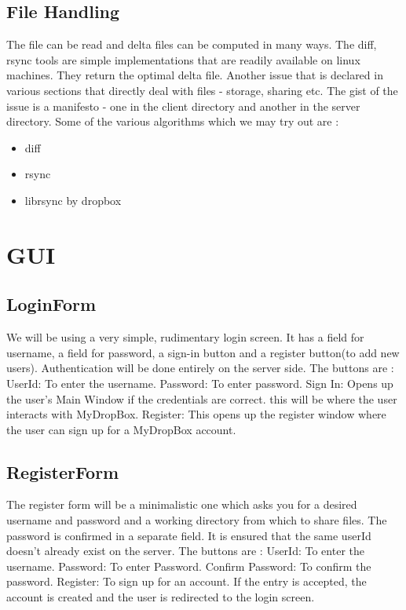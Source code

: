 \documentclass[]{article}
\begin{document}
\subsection{File Handling}
The file can be read and delta files can be computed in many ways. The diff, rsync tools are simple implementations that are readily available on linux machines. They return the optimal delta file.
Another issue that is declared in various sections that directly deal with files - storage, sharing etc.
The gist of the issue is a manifesto - one in the client directory and another in the server directory.
Some of the various algorithms which we may try out are :
\begin{itemize}
\item diff
\item rsync
\item librsync by dropbox
\end{itemize}

\section{GUI}
\subsection{LoginForm}
We will be using a very simple, rudimentary login screen. It has a field for username, a field for password, a sign-in button and a register button(to add new users). Authentication will be done entirely on the server side. 
The buttons are :
UserId: To enter the username.
Password: To enter password.
Sign In: Opens up the user's Main Window if the credentials are correct. this will be where the user interacts with MyDropBox.
Register: This opens up the register window where the user can sign up for a MyDropBox account.



\subsection{RegisterForm}
The register form will be a minimalistic one which asks you for a desired username and password and a working directory from which to share files. The password is confirmed in a separate field. It is ensured that the same userId doesn't already exist on the server. 
The buttons are :
UserId: To enter the username.
Password: To enter Password.
Confirm Password: To confirm the password.
Register: To sign up for an account. If the entry is accepted, the account is created and the user is redirected to the login screen.  
\end{document}
